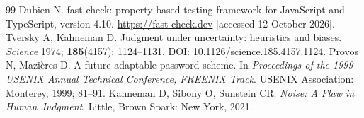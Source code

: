 \begin{thebibliography}{99}
 Dubien N. fast-check: property-based testing framework for JavaScript and TypeScript, version 4.10. \url{https://fast-check.dev} [accessed 12 October 2026].
 Tversky A, Kahneman D. Judgment under uncertainty: heuristics and biases. \emph{Science} 1974; \textbf{185}(4157): 1124--1131. DOI: 10.1126/science.185.4157.1124.
 Provos N, Mazi\`eres D. A future-adaptable password scheme. In \emph{Proceedings of the 1999 USENIX Annual Technical Conference, FREENIX Track}. USENIX Association: Monterey, 1999; 81--91.
 Kahneman D, Sibony O, Sunstein CR. \emph{Noise: A Flaw in Human Judgment}. Little, Brown Spark: New York, 2021.
\end{thebibliography}
\endgroup
